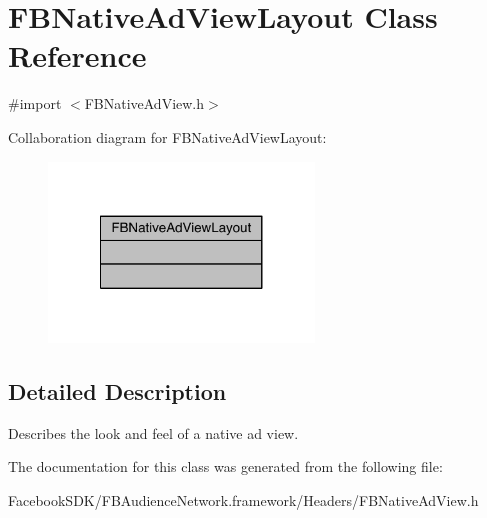 \hypertarget{class_f_b_native_ad_view_layout}{\section{F\-B\-Native\-Ad\-View\-Layout Class Reference}
\label{class_f_b_native_ad_view_layout}
}


{\ttfamily \#import $<$F\-B\-Native\-Ad\-View.\-h$>$}



Collaboration diagram for F\-B\-Native\-Ad\-View\-Layout\-:
\nopagebreak
\begin{figure}[H]
\begin{center}
\leavevmode
\includegraphics[width=200pt]{class_f_b_native_ad_view_layout__coll__graph}
\end{center}
\end{figure}


\subsection{Detailed Description}
Describes the look and feel of a native ad view. 

The documentation for this class was generated from the following file\-:\begin{DoxyCompactItemize}
\item 
Facebook\-S\-D\-K/\-F\-B\-Audience\-Network.\-framework/\-Headers/F\-B\-Native\-Ad\-View.\-h\end{DoxyCompactItemize}
